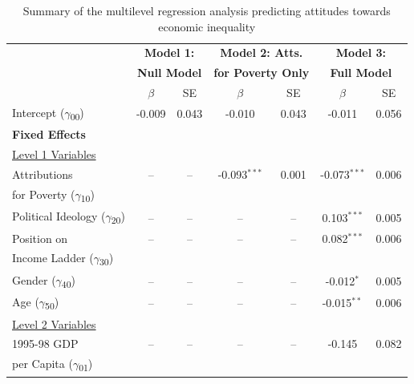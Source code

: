 \documentclass{sfuthesis}
\begin{document}
\begin{table}[h]
  \begin{center}
    \caption{Summary of the multilevel regression analysis predicting attitudes towards economic inequality}
    \label{tab:secondtable}
    \begin{tabular}{l c c c c c c}%
    \hline   
       & \multicolumn{2}{c}{\textbf{Model 1:}} & \multicolumn{2}{c}{\textbf{Model 2: Atts.}} & \multicolumn{2}{c}{\textbf{Model 3:}}\\
       & \multicolumn{2}{c}{\textbf{Null Model}} & \multicolumn{2}{c}{\textbf{for Poverty Only}} & \multicolumn{2}{c}{\textbf{Full Model}}\\
       & $\beta$ & SE & $\beta$ & SE & $\beta$ & SE\\
      \hline
      Intercept ($\gamma$\textsubscript{00}) & -0.009 & 0.043 & \multicolumn{1}{S}{-0.010} & \multicolumn{1}{S}{0.043} & \multicolumn{1}{S}{-0.011} & \multicolumn{1}{S}{0.056}\\
     \textbf{Fixed Effects}\\
      \underline{Level 1 Variables}\\
      Attributions & -- & -- & \multicolumn{1}{S}{-0.093$^{***}$} & \multicolumn{1}{S}{0.001} & \multicolumn{1}{S}{-0.073$^{***}$} & \multicolumn{1}{S}{0.006}\\
      for Poverty ($\gamma$\textsubscript{10})\\
      Political Ideology ($\gamma$\textsubscript{20}) & -- & -- & -- & -- & \multicolumn{1}{S}{0.103$^{***}$} & \multicolumn{1}{S}{0.005}\\
      Position on & -- & -- & -- & -- & \multicolumn{1}{S}{0.082$^{***}$} & \multicolumn{1}{S}{0.006}\\
      Income Ladder ($\gamma$\textsubscript{30})\\
      Gender ($\gamma$\textsubscript{40}) & -- & -- & -- & -- & \multicolumn{1}{S}{-0.012$^{*}$} & \multicolumn{1}{S}{0.005}\\
      Age ($\gamma$\textsubscript{50}) & -- & -- & -- & -- & \multicolumn{1}{S}{-0.015$^{**}$} & \multicolumn{1}{S}{0.006}\\
      \underline{Level 2 Variables} & & & & & & \\
      1995-98 GDP & -- & -- & -- & -- & \multicolumn{1}{S}{-0.145} & \multicolumn{1}{S}{0.082}\\
      per Capita ($\gamma$\textsubscript{01})\\

\end{tabular}
\end{center}
\end{table}
\end{document}
